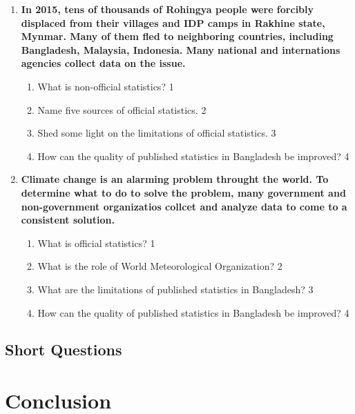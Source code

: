 \documentclass[a4paper,oneside]{book}
\begin{document}
  \begin{enumerate}
 \item
	  \textbf{In 2015, tens of thousands of Rohingya people were forcibly displaced from their villages and IDP camps in Rakhine state, Mynmar. Many of them fled to neighboring countries, including Bangladesh, Malaysia, Indonesia. Many national and internations agencies collect data on the issue.} 
  
  \begin{enumerate}
    \item
	What is non-official statistics? \hfill 1
    \item
	Name five sources of official statistics. \hfill 2
    \item  
	Shed some light on the limitations of official statistics. \hfill 3
    \item
	How can the quality of published statistics in Bangladesh be improved? \hfill 4
  \end{enumerate}
  
   \item
	  \textbf{Climate change is an alarming problem throught the world. To determine what to do to solve the problem, many government and non-government organizatios collcet and analyze data  to come to a consistent solution.} 
  
  \begin{enumerate}
    \item
	What is official statistics?  \hfill 1
    \item
	What is the role of World Meteorological Organization? \hfill 2
    \item  
	What are the limitations of published statistics in Bangladesh? \hfill 3
    \item
	How can the quality of published statistics in Bangladesh be improved? \hfill 4
  \end{enumerate}
 \end{enumerate}
\section{Short Questions}

\backmatter
\chapter{Conclusion}
\lipsum[8]

\tableofcontents
\end{document}
